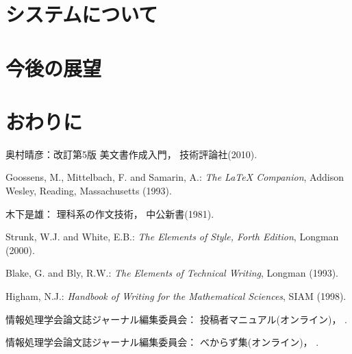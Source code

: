 \documentclass[submit]{ipsj}
\begin{document}
\section{システムについて}


\section{今後の展望}

\section{おわりに}

\begin{thebibliography}{9}
奥村晴彦：改訂第5版 \LaTeXe 美文書作成入門，
技術評論社(2010).

Goossens, M., Mittelbach, F. and Samarin, A.: {\it The LaTeX Companion},
Addison Wesley, Reading, Massachusetts (1993).

木下是雄：
理科系の作文技術，
中公新書(1981).

Strunk, W.J. and White, E.B.: {\it The Elements of Style, Forth Edition},
Longman (2000).

Blake, G. and Bly, R.W.: {\it The Elements of Technical Writing},
Longman (1993).

Higham, N.J.:
{\it Handbook of Writing for the Mathematical Sciences},
SIAM (1998).

情報処理学会論文誌ジャーナル編集委員会：
投稿者マニュアル(オンライン)，
%
.

情報処理学会論文誌ジャーナル編集委員会：
べからず集(オンライン)，
%
.

\end{thebibliography}

\begin{biography}
%
%
\end{biography}
\end{document}
